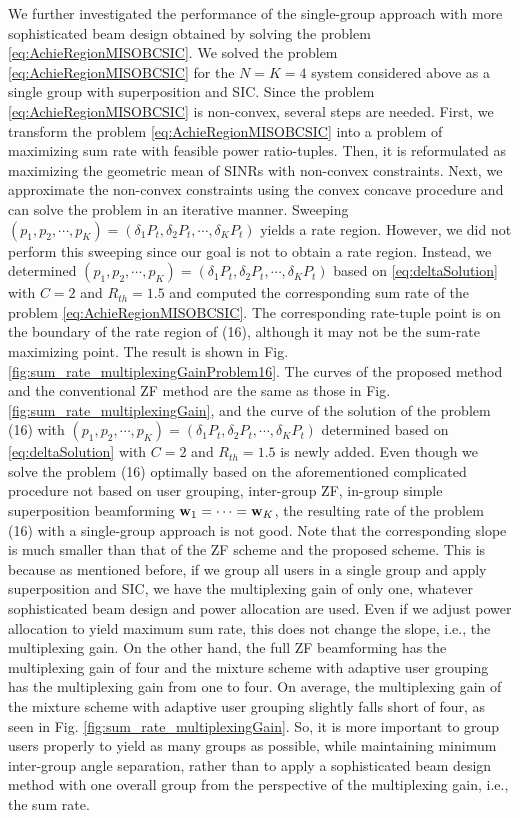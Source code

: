 \documentclass[11pt, draft, onecolumn ]{IEEEtran}
\begin{document}
{We further investigated the performance of the single-group approach with more sophisticated beam design  obtained by solving the problem \eqref{eq:AchieRegionMISOBCSIC}.  We solved the problem \eqref{eq:AchieRegionMISOBCSIC} for the $N=K=4$ system considered above as a single group with superposition and SIC.
Since the problem \eqref{eq:AchieRegionMISOBCSIC} is non-convex, several steps are needed.
First, we transform the problem \eqref{eq:AchieRegionMISOBCSIC} into a problem of maximizing
sum rate  with feasible power ratio-tuples.
Then, it is reformulated as maximizing the geometric mean
of SINRs with non-convex constraints\cite{Hanif16:TSP}.
Next, we approximate the non-convex constraints
using the convex concave procedure\cite{yuille03:Concave} and can solve
the problem in an iterative manner.
Sweeping $(p_1,p_2,\cdots,p_K)=(\delta_1P_t, \delta_2 P_t, \cdots, \delta_K P_t)$ yields a rate region. However, we did not perform this sweeping since our goal is not to obtain a rate region. Instead, we determined $(p_1,p_2,\cdots,p_K)=(\delta_1P_t, \delta_2 P_t, \cdots, \delta_K P_t)$ based on \eqref{eq:deltaSolution} with $C = 2$
and $R_{th} = 1.5$ and computed the corresponding sum rate of the problem \eqref{eq:AchieRegionMISOBCSIC}.
The corresponding rate-tuple point is on the boundary of the rate region of (16), although it may not be the sum-rate maximizing point.  The result is shown in Fig. \ref{fig:sum_rate_multiplexingGainProblem16}.  The curves of the proposed method and the conventional ZF method are the same as those in  Fig. \ref{fig:sum_rate_multiplexingGain}, and the curve of the solution of the problem (16) with $(p_1,p_2,\cdots,p_K)=(\delta_1P_t, \delta_2 P_t, \cdots, \delta_K P_t)$ determined based on \eqref{eq:deltaSolution} with $C = 2$
and $R_{th} = 1.5$ is newly added. Even though we solve the problem (16) optimally based on the aforementioned complicated procedure not based on user grouping, inter-group ZF, in-group simple superposition beamforming ${\bf w}_1=\cdots={\bf w}_K$, the resulting rate of the problem (16) with a single-group approach is not good. Note that the corresponding slope is much smaller than that of  the ZF scheme and the proposed scheme. This is because as mentioned before, if we group all users in a single group and apply superposition and SIC, we have the multiplexing gain of only one, whatever sophisticated beam design and power allocation are used. Even if we adjust power allocation to yield maximum sum rate, this does not change the slope, i.e., the multiplexing gain.  On the other hand, the full ZF beamforming has the multiplexing gain of four and the mixture scheme with adaptive user grouping has the multiplexing gain from one to four. On average, the multiplexing gain of the mixture scheme with adaptive user grouping  slightly falls short of four, as seen in Fig.   \ref{fig:sum_rate_multiplexingGain}.  So, it is more important to group users properly to yield  as many  groups as possible, while maintaining minimum inter-group angle separation,  rather than to apply a sophisticated beam design method with one overall group from the perspective of the multiplexing gain, i.e., the sum rate.}
\end{document}
